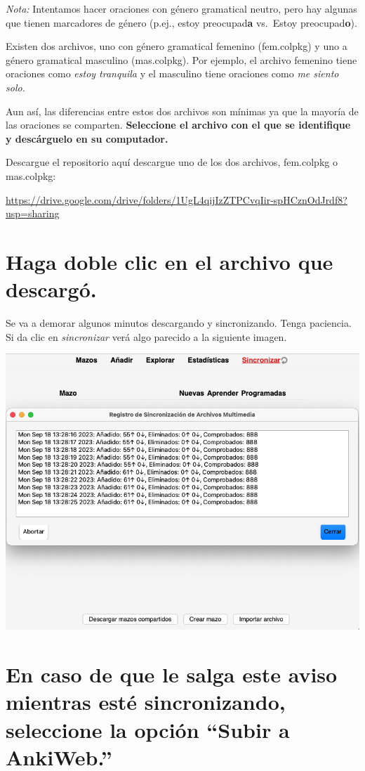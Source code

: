 \documentclass[
]{book}
\begin{document}
\emph{Nota:} Intentamos hacer oraciones con género gramatical neutro, pero hay algunas que tienen marcadores de género (p.ej., estoy preocupad\textbf{a} vs.~Estoy preocupad\textbf{o}).

Existen dos archivos, uno con género gramatical femenino (fem.colpkg) y uno a género gramatical masculino (mas.colpkg). Por ejemplo, el archivo femenino tiene oraciones como \emph{estoy tranquila} y el masculino tiene oraciones como \emph{me siento solo.}

Aun así, las diferencias entre estos dos archivos son mínimas ya que la mayoría de las oraciones se comparten. \textbf{Seleccione el archivo con el que se identifique y descárguelo en su computador.}

Descargue el repositorio aquí descargue uno de los dos archivos, fem.colpkg o mas.colpkg:

\url{https://drive.google.com/drive/folders/1UgL4qijIzZTPCvqIir-spHCznOdJrdf8?usp=sharing}

\hypertarget{haga-doble-clic-en-el-archivo-que-descarguxf3.}{%
\section{Haga doble clic en el archivo que descargó.}\label{haga-doble-clic-en-el-archivo-que-descarguxf3.}}

Se va a demorar algunos minutos descargando y sincronizando. Tenga paciencia. Si da clic en \emph{sincronizar} verá algo parecido a la siguiente imagen.

\includegraphics[width=0.6\linewidth]{images/reposit_sp/sincronizar}

\hypertarget{en-caso-de-que-le-salga-este-aviso-mientras-estuxe9-sincronizando-seleccione-la-opciuxf3n-subir-a-ankiweb.}{%
\section*{En caso de que le salga este aviso mientras esté sincronizando, seleccione la opción ``Subir a AnkiWeb.''}\label{en-caso-de-que-le-salga-este-aviso-mientras-estuxe9-sincronizando-seleccione-la-opciuxf3n-subir-a-ankiweb.}}
\end{document}
